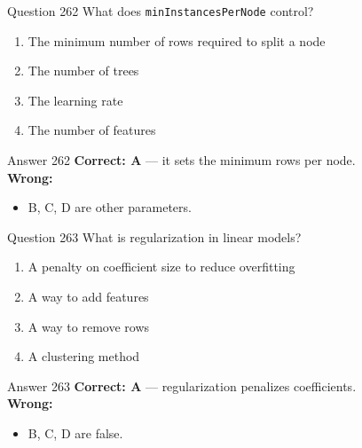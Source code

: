 \documentclass[aspectratio=169,11pt]{beamer}
\begin{document}
	\begin{frame}{Question 262}
		What does \texttt{minInstancesPerNode} control?
		\begin{enumerate}[label=\Alph*.]
			\item The minimum number of rows required to split a node
			\item The number of trees
			\item The learning rate
			\item The number of features
		\end{enumerate}
	\end{frame}
	\begin{frame}{Answer 262}
		\textbf{Correct: A} --- it sets the minimum rows per node.\\
		\vspace{0.5em}
		\textbf{Wrong:}
		\begin{itemize}
			\item B, C, D are other parameters.
		\end{itemize}
	\end{frame}
	
	\begin{frame}{Question 263}
		What is regularization in linear models?
		\begin{enumerate}[label=\Alph*.]
			\item A penalty on coefficient size to reduce overfitting
			\item A way to add features
			\item A way to remove rows
			\item A clustering method
		\end{enumerate}
	\end{frame}
	\begin{frame}{Answer 263}
		\textbf{Correct: A} --- regularization penalizes coefficients.\\
		\vspace{0.5em}
		\textbf{Wrong:}
		\begin{itemize}
			\item B, C, D are false.
		\end{itemize}
	\end{frame}
	
\end{document}
